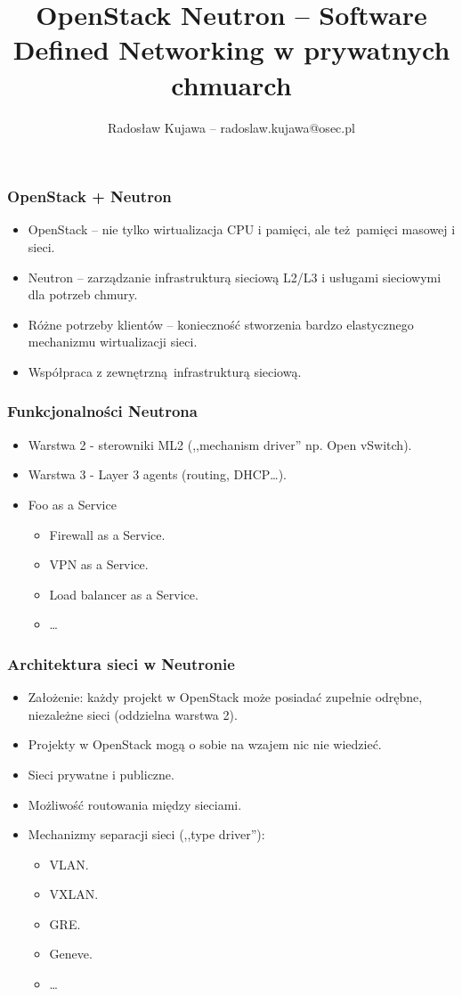\documentclass[dvipsnames,table]{beamer}
\title{OpenStack Neutron -- Software Defined Networking w prywatnych chmuarch}
\author{Radosław Kujawa -- radoslaw.kujawa@osec.pl}
\institute{OSEC}
\begin{document}
\begin{frame}
	\titlepage
\end{frame}

\begin{frame}
\frametitle{OpenStack + Neutron}
\begin{itemize}
	\item OpenStack -- nie tylko wirtualizacja CPU i pamięci, ale też pamięci masowej i sieci.
	\item Neutron -- zarządzanie infrastrukturą sieciową L2/L3 i usługami sieciowymi dla potrzeb chmury.
	\item Różne potrzeby klientów -- konieczność stworzenia bardzo elastycznego mechanizmu wirtualizacji sieci.
	\item Współpraca z zewnętrzną infrastrukturą sieciową.
\end{itemize}
\end{frame}

\begin{frame}
\frametitle{Funkcjonalności Neutrona}
\begin{itemize}
	\item Warstwa 2 - sterowniki ML2 (,,mechanism driver'' np. Open vSwitch).
	\item Warstwa 3 - Layer 3 agents (routing, DHCP\dots).
	\item Foo as a Service
	\begin{itemize}
		\item Firewall as a Service.
		\item VPN as a Service.
		\item Load balancer as a Service.
		\item \dots 
	\end{itemize}
\end{itemize}
\end{frame}

\begin{frame}
\frametitle{Architektura sieci w Neutronie}
\begin{itemize}
	\item Założenie: każdy projekt w OpenStack może posiadać zupełnie odrębne, niezależne sieci (oddzielna warstwa 2).
	\item Projekty w OpenStack mogą o sobie na wzajem nic nie wiedzieć.
	\item Sieci prywatne i publiczne.
	\item Możliwość routowania między sieciami.
	\item Mechanizmy separacji sieci (,,type driver''):
	\begin{itemize}
		\item VLAN.
		\item VXLAN.
		\item GRE.
		\item Geneve.
		\item \dots
	\end{itemize}
\end{itemize}
\end{frame}
\end{document}
